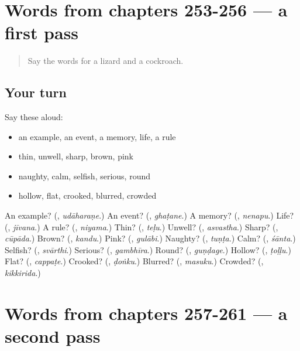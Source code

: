 \section[(dialogue)]{Words from chapters 253-256 — a first pass}

\label{lesson:KA-R261-first-pass-words-from-chapters-253-256}



\begin{quote}
Say the words for a lizard and a cockroach.
\end{quote}

\subsection*{Your turn}
Say these aloud:

\begin{itemize}
\raggedright
  \item an example, an event, a memory, life, a rule
  \item thin, unwell, sharp, brown, pink
  \item naughty, calm, selfish, serious, round
  \item hollow, flat, crooked, blurred, crowded
\end{itemize}

\begin{tcolorbox}[breakable,colback=teal!4,colframe=teal!35!black,title={Before you move on}]
An example? (\textbf{}, \emph{udāharaṇe}.) An event? (\textbf{}, \emph{ghaṭane}.) A memory? (\textbf{}, \emph{nenapu}.) Life? (\textbf{}, \emph{jīvana}.) A rule? (\textbf{}, \emph{niyama}.) Thin? (\textbf{}, \emph{teḷu}.) Unwell? (\textbf{}, \emph{asvastha}.) Sharp? (\textbf{}, \emph{cūpāda}.) Brown? (\textbf{}, \emph{kandu}.) Pink? (\textbf{}, \emph{gulābi}.) Naughty? (\textbf{}, \emph{tuṇṭa}.) Calm? (\textbf{}, \emph{śānta}.) Selfish? (\textbf{}, \emph{svārthi}.) Serious? (\textbf{}, \emph{gambhīra}.) Round? (\textbf{}, \emph{guṇḍage}.) Hollow? (\textbf{}, \emph{ṭoḷḷu}.) Flat? (\textbf{}, \emph{cappaṭe}.) Crooked? (\textbf{}, \emph{ḍoṅku}.) Blurred? (\textbf{}, \emph{masuku}.) Crowded? (\textbf{}, \emph{kikkirida}.)
\end{tcolorbox}
\section[(dialogue)]{Words from chapters 257-261 — a second pass}

